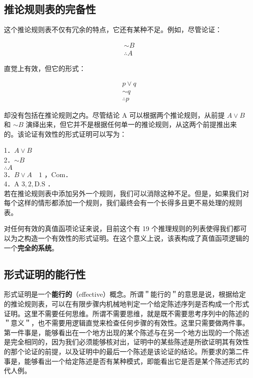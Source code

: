 \subsection{推论规则表的完备性}

这个推论规则表不仅有冗余的特点，它还有某种不足。例如，尽管论证：

$$
\begin{aligned}
& \sim B \\
& \therefore A
\end{aligned}
$$

直觉上有效，但它的形式：

$$
\begin{aligned}
& p \vee q \\
& \sim q \\
& \therefore p
\end{aligned}
$$

却没有包括在推论规则之内。尽管结论 A 可以根据两个推论规则，从前提 $A \vee B$ 和 $\sim B$ 演绎出来，但它并不是根据任何单一的推论规则，从这两个前提推出来的。该论证有效性的形式证明可以写为：

1．$A \vee B$\\
2．$\sim B$\\
$\therefore A$\\
3．$B \vee A \quad 1$ ，Com．\\
4．A $3,2, \mathrm{D} . \mathrm{S}$ ．\\
若在推论规则表中添加另外一个规则，我们可以消除这种不足。但是，如果我们对每个这样的情形都添加一个规则，我们最终会有一个长得多且更不易处理的规则表。

对任何有效的真值函项论证来说，目前这个有 19 个推理规则的列表使得我们都可以为之构造一个有效性的形式证明。在这个意义上说，该表构成了真值函项逻辑的一个\textbf{完全的系统}。\cite{gentzen1935}

\subsection{形式证明的能行性}

形式证明是一个\textbf{能行的}（effective）概念。所谓＂能行的＂的意思是说，根据给定的推论规则表，可以在有限步骤内机械地判定一个给定陈述序列是否构成一个形式证明。这里不需要任何思维。所谓不需要思维，就是既不需要思考序列中的陈述的＂意义＂，也不需要用逻辑直觉来检查任何步骤的有效性。这里只需要做两件事。第一件事是，能够看出在一个地方出现的某个陈述与在另一个地方出现的一个陈述是完全相同的，因为我们必须能够核对出，证明中的某些陈述是所欲证明其有效性的那个论证的前提，以及证明中的最后一个陈述是该论证的结论。所要求的第二件事是，能够看出一个给定陈述是否有某种模式，即能看出它是否是某个陈述形式的代人例。

